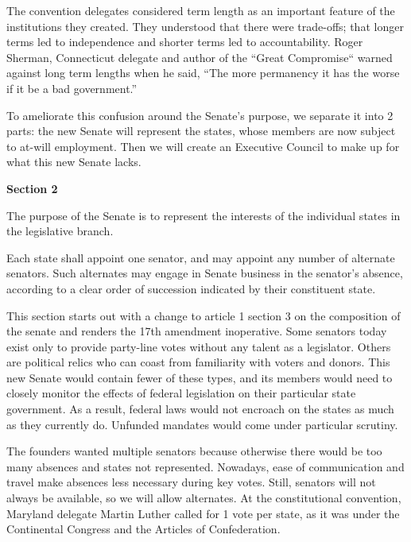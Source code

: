 \documentclass{article}
\begin{document}
The convention delegates considered term length as an important feature of the institutions they created. They understood that there were trade-offs; that longer terms led to independence and shorter terms led to accountability. Roger Sherman, Connecticut delegate and author of the “Great Compromise“ warned against long term lengths when he said, “The more permanency it has the worse if it be a bad government.”\cite{Madison}

To ameliorate this confusion around the Senate's purpose, we separate it into 2 parts: the new Senate will represent the states, whose members are now subject to at-will employment.  Then we will create an Executive Council to make up for what this new Senate lacks.

\begin{quoting}
\textbf{Section 2}

The purpose of the Senate is to represent the interests of the individual states in the legislative branch.

Each state shall appoint one senator, and may appoint any number of alternate senators. Such alternates may engage in Senate business in the senator’s absence, according to a clear order of succession indicated by their constituent state.
\end{quoting}

This section starts out with a change to article 1 section 3 on the composition of the senate and renders the 17th amendment inoperative. Some senators today exist only to provide party-line votes without any talent as a legislator. Others are political relics who can coast from familiarity with voters and donors. This new Senate would contain fewer of these types, and its members would need to closely monitor the effects of federal legislation on their particular state government. As a result, federal laws would not encroach on the states as much as they currently do. Unfunded mandates would come under particular scrutiny.

The founders wanted multiple senators because otherwise there would be too many absences and states not represented. Nowadays, ease of communication and travel make absences less necessary during key votes. Still, senators will not always be available, so we will allow alternates. At the constitutional convention, Maryland delegate Martin Luther called for 1 vote per state, as it was under the Continental Congress and the Articles of Confederation\cite{Senate}.
\end{document}
